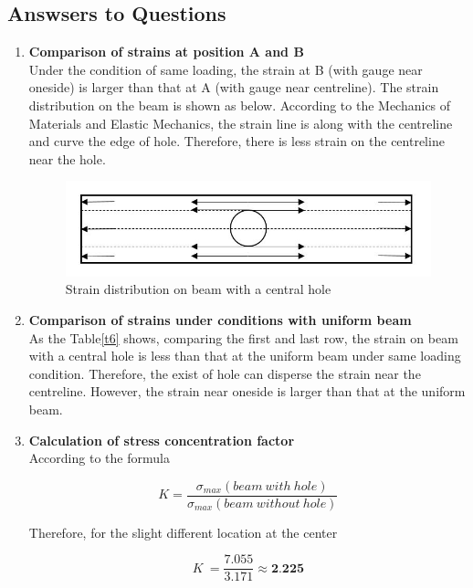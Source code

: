 \documentclass[11pt,a4paper,twoside]{article}
\begin{document}
\subsection{Answsers to Questions}
\begin{enumerate}
\item
\textbf{Comparison of strains at position A and B} \\
Under the condition of same loading, the strain at B (with gauge near oneside) is larger than that at A (with gauge near centreline). The strain distribution on the beam is shown as below. According to the Mechanics of Materials and Elastic Mechanics, the strain line is along with the centreline and curve the edge of hole. Therefore, there is less strain on the centreline near the hole. \\

\begin{figure}[!h]
	\centering
	\includegraphics[width=0.6\linewidth]{10}
	\caption{Strain distribution on beam with a central hole}
	\label{f10}
\end{figure}

\item
\textbf{Comparison of strains under conditions with uniform beam} \\
As the Table\ref{t6} shows, comparing the first and last row, the strain on beam with a central hole is less than that at the uniform beam under same loading condition. Therefore, the exist of hole can disperse the strain near the centreline. However, the strain near oneside is larger than that at the uniform beam. \\

\item
\textbf{Calculation of stress concentration factor} \\
According to the formula 

\begin{equation}
K=\frac{\sigma_{max}(beam \ with\ hole)}{\sigma_{max}(beam \ without \ hole)}
\end{equation}

Therefore, for the slight different location at the center

\begin{equation*}
K\ =\frac{7.055}{3.171} \approx \textbf{2.225}
\end{equation*}



\end{enumerate}
\end{document}
